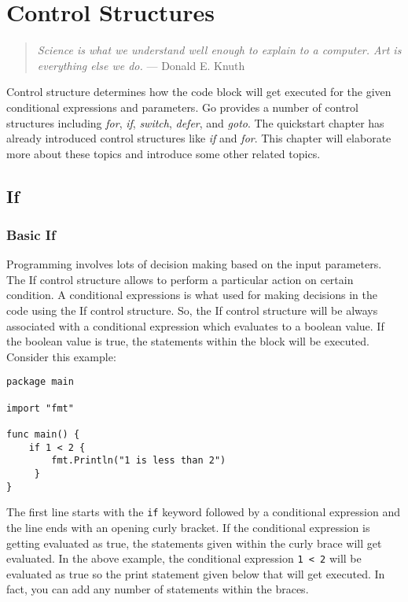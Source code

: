 \cleardoublepage
{}
\chapter{Control Structures}

\begin{quote}
\textit{Science is what we understand well enough to explain to a
computer. Art is everything else we do.} --- Donald E. Knuth
\end{quote}

Control structure determines how the code block will get executed for
the given conditional expressions and parameters.  Go provides a
number of control structures
including \textit{for}, \textit{if}, \textit{switch}, \textit{defer},
and \textit{goto}.  The quickstart chapter has already introduced
control structures like \textit{if} and \textit{for}.  This chapter
will elaborate more about these topics and introduce some other
related topics.

\section{If}

\subsection{Basic If}

Programming involves lots of decision making based on the input
parameters.  The If control structure allows to perform a
particular action on certain condition.  A conditional expressions is
what used for making decisions in the code using the If control
structure.  So, the If control structure will be always associated
with a conditional expression which evaluates to a boolean value.  If
the boolean value is true, the statements within the block will be
executed.  Consider this example:

\begin{lstlisting}[caption=If example program]
package main

import "fmt"

func main() {
    if 1 < 2 {
        fmt.Println("1 is less than 2")
     }
}
\end{lstlisting}

The first line starts with the \texttt{if} keyword followed by a
conditional expression and the line ends with an opening curly
bracket.  If the conditional expression is getting evaluated as true,
the statements given within the curly brace will get evaluated.  In
the above example, the conditional expression \texttt{1 < 2} will be
evaluated as true so the print statement given below that will get
executed.  In fact, you can add any number of statements within the
braces.

